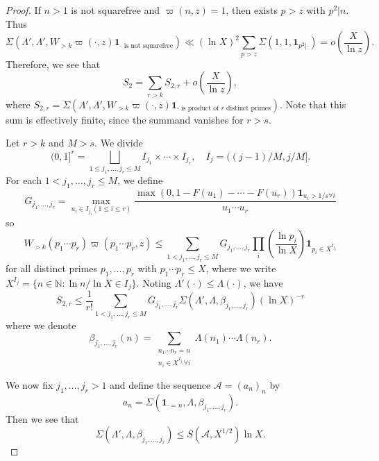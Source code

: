 \documentclass{amsart}
\theoremstyle{definition}
\theoremstyle{remark}
\newcommand{\1}{
    \bm{1}
}
\begin{document}
\begin{proof}





If $n>1$ is not squarefree and $\varpi(n,z)=1$, then exists $p>z$ with $p^2|n$. 
Thus
\[ \Sigma(\Lambda',\Lambda',W_{>k} \varpi(\cdot,z) \1_{\cdot \text{ is not squarefree}}) \ll (\ln{X})^2 \sum_{p>z} \Sigma(1,1,\1_{p^2|\cdot}) = o\left( \frac{X}{\ln{z}} \right). \]
Therefore, we see that
\[ S_2 = \sum_{r>k} S_{2,r} + o\left( \frac{X}{\ln{z}} \right), \]
where $S_{2,r} = \Sigma(\Lambda',\Lambda',W_{>k} \varpi(\cdot,z) \1_{\cdot \text{ is product of $r$ distinct primes}})$. 
Note that this sum is effectively finite, since the summand vanishes for $r>s$.










Let $r>k$ and $M>s$. We divide
\[ (0,1]^r = \bigsqcup_{1 \leq j_1,\ldots,j_r \leq M} I_{j_1} \times \cdots \times I_{j_r}, \quad I_{j} = ((j-1)/M, j/M]. \]
For each $1 < j_1,\ldots,j_r \leq M$, we define
\[ G_{j_1,\ldots,j_r} = \max_{u_i \in I_{j_i} (1\leq i \leq r)} \frac{\max(0,1-F(u_1)-\cdots-F(u_r)) \1_{u_i>1/s\forall i}}{u_1 \cdots u_r} \]
so
\[ W_{>k}(p_1 \cdots p_r) \varpi(p_1 \cdots p_r,z) \leq \sum_{1<j_1,\ldots,j_r \leq M} G_{j_1,\ldots,j_r} \prod_{i} \left( \frac{\ln{p_i}}{\ln{X}} \right) \1_{p_i \in X^{I_{j_i}}} \]
for all distinct primes $p_1, \ldots, p_r$ with $p_1 \cdots p_r \leq X$, where we write $X^{I_j}=\{n \in \mathbb{N}:\ln{n}/\ln{X} \in I_{j} \}$. Noting $\Lambda'(\cdot) \leq \Lambda(\cdot)$, we have
\begin{equation} S_{2,r} \leq \frac{1}{r!} \sum_{1<j_1,\ldots,j_r \leq M} G_{j_1,\ldots,j_r} \Sigma(\Lambda',\Lambda,\beta_{j_1,\ldots,j_r}) (\ln{X})^{-r} \label{S2rp} \end{equation}
where we denote
\[ \beta_{j_1,\ldots,j_r}(n) = \sum_{\substack{n_1 \cdots n_r=n \\ n_i \in X^{I_{j_i}} \forall i}} \Lambda(n_1) \cdots \Lambda(n_r). \]



We now fix $j_1,\ldots,j_r>1$ and define the sequence $\mathcal{A}=(a_n)_n$ by 
\[ a_n = \Sigma(\1_{\cdot=n},\Lambda,\beta_{j_1,\ldots,j_r}). \]
Then we see that
\[ \Sigma(\Lambda',\Lambda,\beta_{j_1,\ldots,j_r}) \leq S(\mathcal{A},X^{1/2}) \ln{X}. \]



\end{proof}
\end{document}
